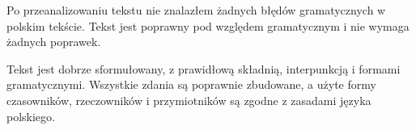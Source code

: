 Po przeanalizowaniu tekstu nie znalazłem żadnych błędów gramatycznych w polskim tekście. Tekst jest poprawny pod względem gramatycznym i nie wymaga żadnych poprawek.

Tekst jest dobrze sformułowany, z prawidłową składnią, interpunkcją i formami gramatycznymi. Wszystkie zdania są poprawnie zbudowane, a użyte formy czasowników, rzeczowników i przymiotników są zgodne z zasadami języka polskiego.